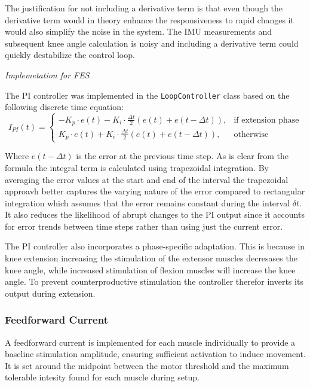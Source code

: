 The justification for not including a derivative term is that even though the derivative term would in theory enhance the responsiveness to rapid changes it would also simplify the noise in the system. The IMU measurements and subsequent knee angle calculation is noisy and including a derivative term could quickly destabilize the control loop.
\newline 

\textit{Implemetation for FES}

The PI controller was implemented in the \texttt{LoopController} class based on the following discrete time equation:
\begin{equation}
I_{PI}(t) = 
\begin{cases} 
-K_p \cdot e(t) - K_i \cdot \frac{\Delta t}{2} \left(e(t) + e(t-\Delta t)\right), & \text{if extension phase} \\
K_p \cdot e(t) + K_i \cdot \frac{\Delta t}{2} \left(e(t) + e(t-\Delta t)\right), & \text{otherwise}
\end{cases}
\end{equation}

Where \( e(t-\Delta t) \) is the error at the previous time step. As is clear from the formula the integral term is calculated using trapezoidal integration. By averaging the error values at the start and end of the interval the trapezoidal approavh better captures the varying nature of the error compared to rectangular integration which assumes that the error remains constant during the interval \(\delta t\). It also reduces the likelihood of abrupt changes to the PI output since it accounts for error trends between time steps rather than using just the current error.

The PI controller also incorporates a phase-specific adaptation. This is because in knee extension increasing the stimulation of the extensor muscles decresases the knee angle, while increased stimulation of flexion muscles will increase the knee angle. To prevent counterproductive stimulation the controller therefor inverts its output during extension.


\subsubsection{Feedforward Current}
A feedforward current is implemented for each muscle individually to provide a baseline stimulation amplitude, ensuring sufficient activation to induce movement. It is set around the midpoint between the motor threshold and the maximum tolerable intesity found for each muscle during setup. 

